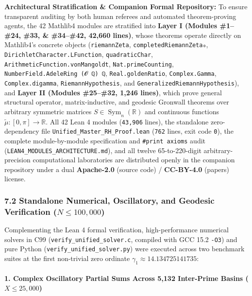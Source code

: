 \documentclass[
  11pt,
]{article}
\begin{document}
\textbf{Architectural Stratification \& Companion Formal Repository:} To
ensure transparent auditing by both human referees and automated
theorem-proving agents, the 42 Mathlib4 modules are stratified into
\textbf{Layer I (Modules \#1--\#24, \#33, \& \#34--\#42, 42,660 lines)},
whose theorems operate directly on Mathlib4's concrete objects
(\texttt{riemannZeta}, \texttt{completedRiemannZeta₀},
\texttt{DirichletCharacter.LFunction}, \texttt{quadraticChar},
\texttt{ArithmeticFunction.vonMangoldt}, \texttt{Nat.primeCounting},
\texttt{NumberField.AdeleRing\ (𝓞\ ℚ)\ ℚ}, \texttt{Real.goldenRatio},
\texttt{Complex.Gamma}, \texttt{Complex.digamma},
\texttt{RiemannHypothesis}, and \texttt{GeneralizedRiemannHypothesis}),
and \textbf{Layer II (Modules \#25--\#32, 1,246 lines)}, which prove
general structural operator, matrix-inductive, and geodesic Gronwall
theorems over arbitrary symmetric matrices
\(S \in \operatorname{Sym}_n(\mathbb{R})\) and continuous functions
\(\tilde{\mu} : [0, \pi] \to \mathbb{R}\). All 42 Lean 4 modules
(\texttt{43,906} lines), the standalone zero-dependency file
\texttt{Unified\_Master\_RH\_Proof.lean} (\texttt{762} lines, exit code
\texttt{0}), the complete module-by-module specification and
\texttt{\#print\ axioms} audit
(\texttt{LEAN4\_MODULES\_ARCHITECTURE.md}), and all twelve
65-to-220-digit arbitrary-precision computational laboratories are
distributed openly in the companion repository under a dual
\textbf{Apache-2.0} (source code) / \textbf{CC-BY-4.0} (papers) license.

\subsubsection{\texorpdfstring{7.2 Standalone Numerical, Oscillatory,
and Geodesic Verification
(\(N \le 100{,}000\))}{7.2 Standalone Numerical, Oscillatory, and Geodesic Verification (N \textbackslash le 100\{,\}000)}}\label{standalone-numerical-oscillatory-and-geodesic-verification-n-le-100000}

Complementing the Lean 4 formal verification, high-performance numerical
solvers in C99 (\texttt{verify\_unified\_solver.c}, compiled with GCC
15.2 \texttt{-O3}) and pure Python (\texttt{verify\_unified\_solver.py})
were executed across two benchmark suites at the first non-trivial zero
ordinate \(\gamma_1 \approx 14.134725141735\):

\paragraph{\texorpdfstring{1. Complex Oscillatory Partial Sums Across
5,132 Inter-Prime Basins
(\(X \le 25{,}000\))}{1. Complex Oscillatory Partial Sums Across 5,132 Inter-Prime Basins (X \textbackslash le 25\{,\}000)}}\label{complex-oscillatory-partial-sums-across-5132-inter-prime-basins-x-le-25000}
\end{document}
